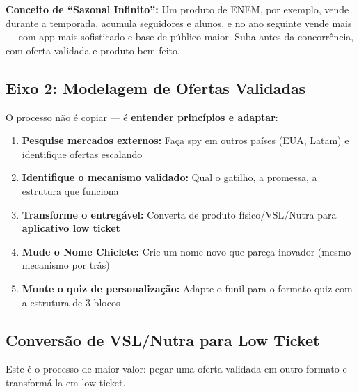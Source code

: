 \documentclass[12pt, a4paper]{article}
\begin{document}
\textcolor{primaryColor}{\textbf{Conceito de ``Sazonal Infinito'':}} Um produto de ENEM, por exemplo, vende durante a temporada, acumula seguidores e alunos, e no ano seguinte vende mais --- com app mais sofisticado e base de público maior. Suba antes da concorrência, com oferta validada e produto bem feito.

\subsection{Eixo 2: Modelagem de Ofertas Validadas}

O processo não é copiar --- é \textbf{entender princípios e adaptar}:

\begin{enumerate}
    \item \textbf{Pesquise mercados externos:} Faça spy em outros países (EUA, Latam) e identifique ofertas escalando
    \item \textbf{Identifique o mecanismo validado:} Qual o gatilho, a promessa, a estrutura que funciona
    \item \textbf{Transforme o entregável:} Converta de produto físico/VSL/Nutra para \textbf{aplicativo low ticket}
    \item \textbf{Mude o Nome Chiclete:} Crie um nome novo que pareça inovador (mesmo mecanismo por trás)
    \item \textbf{Monte o quiz de personalização:} Adapte o funil para o formato quiz com a estrutura de 3 blocos
\end{enumerate}

\needspace{8cm}

\subsection{Conversão de VSL/Nutra para Low Ticket}

Este é o processo de maior valor: pegar uma oferta validada em outro formato e transformá-la em low ticket.
\end{document}
